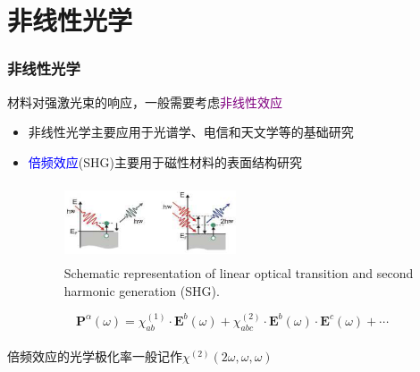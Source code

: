 \documentclass[cjk,slidestop,compress,mathserif,blue]{beamer}
\begin{document}
\section{非线性光学}
\frame
{
	\frametitle{非线性光学}
	材料对强激光束的响应，一般需要考虑\textcolor{purple}{非线性效应}
\begin{itemize}
	\item 非线性光学主要应用于光谱学、电信和天文学等的基础研究
	\item \textcolor{blue}{倍频效应}(\textrm{SHG})主要用于磁性材料的表面结构研究
\begin{figure}[h!]
\centering
\vspace*{-0.2in}
\includegraphics[height=0.9in,width=2.0in,viewport=0 0 700 250,clip]{Figures/nlo-optic.png}
\caption{\small \textrm{Schematic representation of linear optical transition and second harmonic generation (SHG).}}%
\label{nlo-optic}
\end{figure} 
\end{itemize}
\vspace{-12pt}
\begin{displaymath}
	\mathbf{P}^{\alpha}(\omega)=\chi_{ab}^{(1)}\cdot\mathbf{E}^b(\omega)+\chi_{abc}^{(2)}\cdot\mathbf{E}^b(\omega)\cdot\mathbf{E}^c(\omega)+\cdots
\end{displaymath}
{\fontsize{8.5pt}{8pt}}\\
倍频效应的光学极化率一般记作$\chi^{(2)}(2\omega,\omega,\omega)$
}
\end{document}
